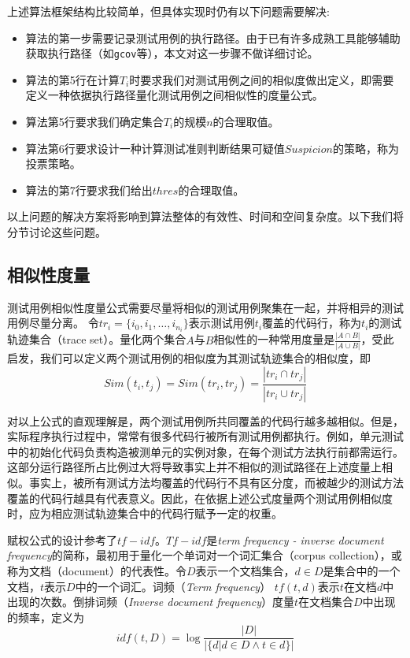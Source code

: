 上述算法框架结构比较简单，但具体实现时仍有以下问题需要解决:
\begin{itemize}
	\item 算法的第一步需要记录测试用例的执行路径。由于已有许多成熟工具能够辅助获取执行路径（如\texttt{gcov}等），本文对这一步骤不做详细讨论。
	\item 算法的第5行在计算$T_i$时要求我们对测试用例之间的相似度做出定义，即需要定义一种依据执行路径量化测试用例之间相似性的度量公式。
	\item 算法第5行要求我们确定集合$T_i$的规模$n$的合理取值。
	\item 算法第6行要求设计一种计算测试准则判断结果可疑值$Suspicion$的策略，称为投票策略。
	\item 算法的第7行要求我们给出$thres$的合理取值。
\end{itemize}
以上问题的解决方案将影响到算法整体的有效性、时间和空间复杂度。以下我们将分节讨论这些问题。

\subsection{相似性度量}

测试用例相似性度量公式需要尽量将相似的测试用例聚集在一起，并将相异的测试用例尽量分离。
令${tr}_i = \{i_0, i_1, \ldots, i_{n_i}\}$表示测试用例$t_i$覆盖的代码行，称为$t_i$的测试轨迹集合（trace set）。量化两个集合$A$与$B$相似性的一种常用度量是$\frac{|A \cap B|}{|A \cup B|}$，受此启发，我们可以定义两个测试用例的相似度为其测试轨迹集合的相似度，即
$$
Sim(t_i, t_j) = Sim({tr}_i, {tr}_j) =\frac{|{tr}_i \cap {tr}_j|}{|{tr}_i \cup {tr}_j|}
$$

对以上公式的直观理解是，两个测试用例所共同覆盖的代码行越多越相似。但是，实际程序执行过程中，常常有很多代码行被所有测试用例都执行。例如，单元测试中的初始化代码负责构造被测单元的实例对象，在每个测试方法执行前都需运行。这部分运行路径所占比例过大将导致事实上并不相似的测试路径在上述度量上相似。事实上，被所有测试方法均覆盖的代码行不具有区分度，而被越少的测试方法覆盖的代码行越具有代表意义。因此，在依据上述公式度量两个测试用例相似度时，应为相应测试轨迹集合中的代码行赋予一定的权重。

赋权公式的设计参考了$tf-idf$\cite{wiki:tf-idf}。$Tf-idf$是\textit{term frequency - inverse document frequency}的简称，最初用于量化一个单词对一个词汇集合（corpus collection），或称为文档（document）的代表性。令$D$表示一个文档集合，$d \in D$是集合中的一个文档，$t$表示$D$中的一个词汇。词频（\textit{Term frequency}） $tf(t, d)$表示$t$在文档$d$中出现的次数。倒排词频（\textit{Inverse document frequency}）度量$t$在文档集合$D$中出现的频率，定义为
$$
idf(t, D) = \log{\frac{|D|}{|\{d| d \in D \wedge t \in d\}|}}
$$

